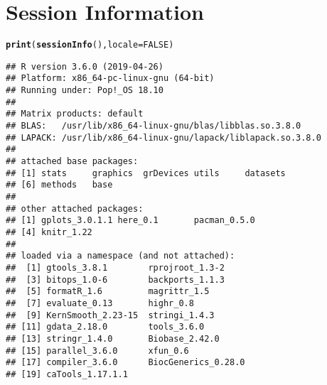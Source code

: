 \documentclass[11pt,letter]{article}\usepackage[]{graphicx}\usepackage[]{color}
\makeatletter
\newcommand{\hlnum}[1]{\textcolor[rgb]{0.686,0.059,0.569}{#1}}%
\newcommand{\hlstd}[1]{\textcolor[rgb]{0.345,0.345,0.345}{#1}}%
\newcommand{\hlkwc}[1]{\textcolor[rgb]{0.333,0.667,0.333}{#1}}%
\newcommand{\hlkwd}[1]{\textcolor[rgb]{0.737,0.353,0.396}{\textbf{#1}}}%
\newenvironment{kframe}{%
 \def\at@end@of@kframe{}%
 \ifinner\ifhmode%
  \def\at@end@of@kframe{\end{minipage}}%
  \begin{minipage}{\columnwidth}%
 \fi\fi%
 \def\FrameCommand##1{\hskip\@totalleftmargin \hskip-\fboxsep
 \colorbox{shadecolor}{##1}\hskip-\fboxsep
     \hskip-\linewidth \hskip-\@totalleftmargin \hskip\columnwidth}%
 \MakeFramed {\advance\hsize-\width
   \@totalleftmargin\z@ \linewidth\hsize
   \@setminipage}}%
 {\par\unskip\endMakeFramed%
 \at@end@of@kframe}
\newenvironment{knitrout}{}{} %
\makeatother
\begin{document}
\FloatBarrier



\newpage
\appendix
\section{Session Information}
\begin{knitrout}
\color{fgcolor}\begin{kframe}
\begin{alltt}
\hlkwd{print}\hlstd{(}\hlkwd{sessionInfo}\hlstd{(),} \hlkwc{locale} \hlstd{=} \hlnum{FALSE}\hlstd{)}
\end{alltt}
\begin{verbatim}
## R version 3.6.0 (2019-04-26)
## Platform: x86_64-pc-linux-gnu (64-bit)
## Running under: Pop!_OS 18.10
## 
## Matrix products: default
## BLAS:   /usr/lib/x86_64-linux-gnu/blas/libblas.so.3.8.0
## LAPACK: /usr/lib/x86_64-linux-gnu/lapack/liblapack.so.3.8.0
## 
## attached base packages:
## [1] stats     graphics  grDevices utils     datasets 
## [6] methods   base     
## 
## other attached packages:
## [1] gplots_3.0.1.1 here_0.1       pacman_0.5.0  
## [4] knitr_1.22    
## 
## loaded via a namespace (and not attached):
##  [1] gtools_3.8.1        rprojroot_1.3-2    
##  [3] bitops_1.0-6        backports_1.1.3    
##  [5] formatR_1.6         magrittr_1.5       
##  [7] evaluate_0.13       highr_0.8          
##  [9] KernSmooth_2.23-15  stringi_1.4.3      
## [11] gdata_2.18.0        tools_3.6.0        
## [13] stringr_1.4.0       Biobase_2.42.0     
## [15] parallel_3.6.0      xfun_0.6           
## [17] compiler_3.6.0      BiocGenerics_0.28.0
## [19] caTools_1.17.1.1
\end{verbatim}
\end{kframe}
\end{knitrout}
\end{document}
